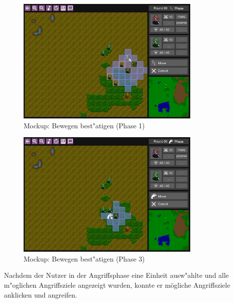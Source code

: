 \documentclass[12pt, titlepage]{scrartcl}
\newcounter{subsubsubsection}[subsubsection]
\begin{document}
                    \begin{figure}[H] 
                    	\centering
                    	\includegraphics[width=0.8\textwidth]{images/mockups/ConfirmMove.png}
                    	\caption{Mockup: Bewegen best"atigen (Phase 1)}
                    	\label{Move}
                    \end{figure}
	                \begin{figure}[H] 
	                	\centering
	                	\includegraphics[width=0.8\textwidth]{images/mockups/ConfirmMove2.png}
	                	\caption{Mockup: Bewegen best"atigen (Phase 3)}
	                	\label{Move2}
	                \end{figure}
			        Nachdem der Nutzer in der Angriffsphase eine Einheit ausw"ahlte und alle m"oglichen Angriffsziele angezeigt wurden, konnte er m\"ogliche Angriffsziele anklicken und angreifen. \\
\end{document}
